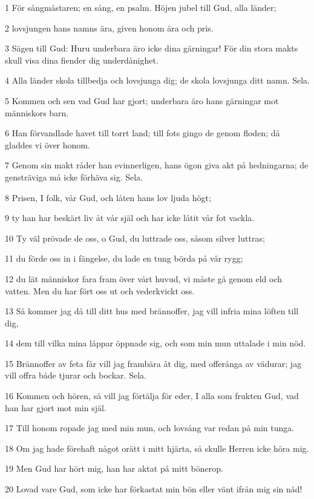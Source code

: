 \par 1 För sångmästaren; en sång, en psalm. Höjen jubel till Gud, alla länder;
\par 2 lovsjungen hans namns ära, given honom ära och pris.
\par 3 Sägen till Gud: Huru underbara äro icke dina gärningar! För din stora makts skull visa dina fiender dig underdånighet.
\par 4 Alla länder skola tillbedja och lovsjunga dig; de skola lovsjunga ditt namn. Sela.
\par 5 Kommen och sen vad Gud har gjort; underbara äro hans gärningar mot människors barn.
\par 6 Han förvandlade havet till torrt land; till fots gingo de genom floden; då gladdes vi över honom.
\par 7 Genom sin makt råder han evinnerligen, hans ögon giva akt på hedningarna; de gensträviga må icke förhäva sig. Sela.
\par 8 Prisen, I folk, vår Gud, och låten hans lov ljuda högt;
\par 9 ty han har beskärt liv åt vår själ och har icke låtit vår fot vackla.
\par 10 Ty väl prövade de oss, o Gud, du luttrade oss, såsom silver luttras;
\par 11 du förde oss in i fängelse, du lade en tung börda på vår rygg;
\par 12 du lät människor fara fram över vårt huvud, vi måste gå genom eld och vatten. Men du har fört oss ut och vederkvickt oss.
\par 13 Så kommer jag då till ditt hus med brännoffer, jag vill infria mina löften till dig,
\par 14 dem till vilka mina låppar öppnade sig, och som min mun uttalade i min nöd.
\par 15 Brännoffer av feta får vill jag frambära åt dig, med offerånga av vädurar; jag vill offra både tjurar och bockar. Sela.
\par 16 Kommen och hören, så vill jag förtälja för eder, I alla som frukten Gud, vad han har gjort mot min själ.
\par 17 Till honom ropade jag med min mun, och lovsång var redan på min tunga.
\par 18 Om jag hade förehaft något orätt i mitt hjärta, så skulle Herren icke höra mig.
\par 19 Men Gud har hört mig, han har aktat på mitt bönerop.
\par 20 Lovad vare Gud, som icke har förkastat min bön eller vänt ifrån mig sin nåd!

